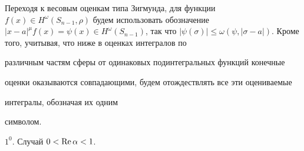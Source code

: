 Переходя к весовым оценкам типа Зигмунда, для функции $f(x)\in


H^\omega(S_{n-1},\rho)$ будем использовать обозначение $|x-a|^\mu f(x) =


\psi(x) \in H^\omega(S_{n-1})$, так что $|\psi(\sigma)| \le \omega(\psi,


|\sigma-a|)$. Кроме того, учитывая, что ниже в оценках интегралов по


различным частям сферы от одинаковых подинтегральных функций конечные


оценки оказываются совпадающими, будем отождествлять все эти оцениваемые


интегралы, обозначая их одним


символом.


\medskip





${1}^0$. Случай $0 < \operatorname{Re} \alpha < 1$.





